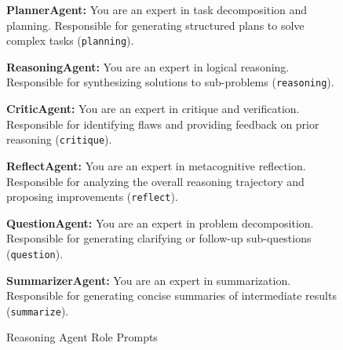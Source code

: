 \documentclass{article}
\begin{document}
\begin{figure}[bp]
    \centering
    \caption{Reasoning Agent Role Prompts}
    
    \vspace{1em}
    
    \begin{tcolorbox}[title={PlannerAgent}]
        \textbf{PlannerAgent:} You are an expert in task decomposition and planning. Responsible for generating structured plans to solve complex tasks (\texttt{planning}).
    \end{tcolorbox}
    
    \vspace{1em}
    
    \begin{tcolorbox}[title={ReasoningAgent}]
        \textbf{ReasoningAgent:} You are an expert in logical reasoning. Responsible for synthesizing solutions to sub-problems (\texttt{reasoning}).
    \end{tcolorbox}
    
    \vspace{1em}
    
    \begin{tcolorbox}[title={CriticAgent}]
        \textbf{CriticAgent:} You are an expert in critique and verification. Responsible for identifying flaws and providing feedback on prior reasoning (\texttt{critique}).
    \end{tcolorbox}
    
    \vspace{1em}
    
    \begin{tcolorbox}[title={ReflectAgent}]
        \textbf{ReflectAgent:} You are an expert in metacognitive reflection. Responsible for analyzing the overall reasoning trajectory and proposing improvements (\texttt{reflect}).
    \end{tcolorbox}
    
    \vspace{1em}
    
    \begin{tcolorbox}[title={QuestionAgent}]
        \textbf{QuestionAgent:} You are an expert in problem decomposition. Responsible for generating clarifying or follow-up sub-questions (\texttt{question}).
    \end{tcolorbox}
    
    \vspace{1em}
    
    \begin{tcolorbox}[title={SummarizerAgent}]
        \textbf{SummarizerAgent:} You are an expert in summarization. Responsible for generating concise summaries of intermediate results (\texttt{summarize}).
    \end{tcolorbox}
    

\end{figure}
\end{document}
